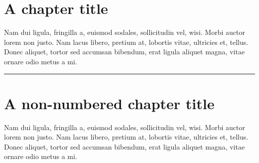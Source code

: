 \let\clearforchapter\par %
\chapter{A chapter title}
Nam dui ligula, fringilla a, euismod sodales, sollicitudin vel,
wisi. Morbi auctor lorem non justo. Nam lacus libero, pretium at,
lobortis vitae, ultricies et, tellus. Donec aliquet, tortor sed
accumsan bibendum, erat ligula aliquet magna, vitae ornare odio metus
a mi.
\par\fancybreak{$***$}\par
\chapter*{A non-numbered chapter title}
Nam dui ligula, fringilla a, euismod sodales, sollicitudin vel,
wisi. Morbi auctor lorem non justo. Nam lacus libero, pretium at,
lobortis vitae, ultricies et, tellus. Donec aliquet, tortor sed
accumsan bibendum, erat ligula aliquet magna, vitae ornare odio metus
a mi.  \thispagestyle{empty}
